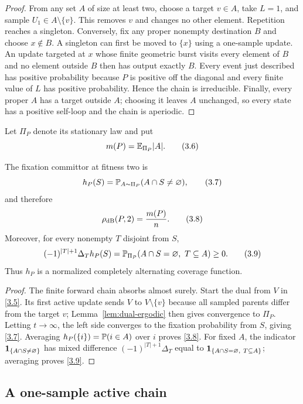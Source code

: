 \begin{proof}
From any set $A$ of size at least two, choose a target $v\in A$, take $L=1$,
and sample $U_1\in A\setminus\{v\}$.  This removes $v$ and changes no other
element.  Repetition reaches a singleton.  Conversely, fix any proper
nonempty destination $B$ and choose $x\notin B$.  A singleton can first be
moved to $\{x\}$ using a one-sample update.  An update targeted at $x$ whose
finite geometric burst visits every element of $B$ and no element outside
$B$ then has output exactly $B$.  Every event just described has positive
probability because $P$ is positive off the diagonal and every finite value
of $L$ has positive probability.  Hence the chain is irreducible.  Finally,
every proper $A$ has a target outside $A$; choosing it leaves $A$ unchanged,
so every state has a positive self-loop and the chain is aperiodic.
\end{proof}

Let $\Pi_P$ denote its stationary law and put
\[
 m(P)=\mathbb E_{\Pi_P}|A|.                                         \tag{3.6}\label{3.6}
\]

\begin{proposition}\label{prop:coverage}
The fixation committor at fitness two is
\[
 h_P(S)=\mathbb P_{A\sim\Pi_P}(A\cap S\ne\varnothing),            \tag{3.7}\label{3.7}
\]
and therefore
\[
 \rho_{\mathrm{dB}}(P,2)=\frac{m(P)}n.                              \tag{3.8}\label{3.8}
\]
Moreover, for every nonempty $T$ disjoint from $S$,
\[
 (-1)^{|T|+1}\Delta_T h_P(S)
 =\mathbb P_{\Pi_P}(A\cap S=\varnothing,\ T\subseteq A)\ge0.      \tag{3.9}\label{3.9}
\]
Thus $h_P$ is a normalized completely alternating coverage function.
\end{proposition}

\begin{proof}
The finite forward chain absorbs almost surely.  Start the dual from $V$ in
\eqref{3.5}.  Its first active update sends $V$ to $V\setminus\{v\}$ because
all sampled parents differ from the target $v$; Lemma~\ref{lem:dual-ergodic}
then gives convergence to $\Pi_P$.  Letting $t\to\infty$, the left side
converges to the fixation probability from $S$, giving \eqref{3.7}.
Averaging $h_P(\{i\})=\mathbb P(i\in A)$ over $i$ proves
\eqref{3.8}.  For fixed $A$, the indicator
$\mathbf 1_{\{A\cap S\ne\varnothing\}}$ has mixed difference
$(-1)^{|T|+1}\Delta_T$ equal to
$\one_{\{A\cap S=\varnothing,\ T\subseteq A\}}$; averaging proves
\eqref{3.9}.
\end{proof}

\subsection{A one-sample active chain}

